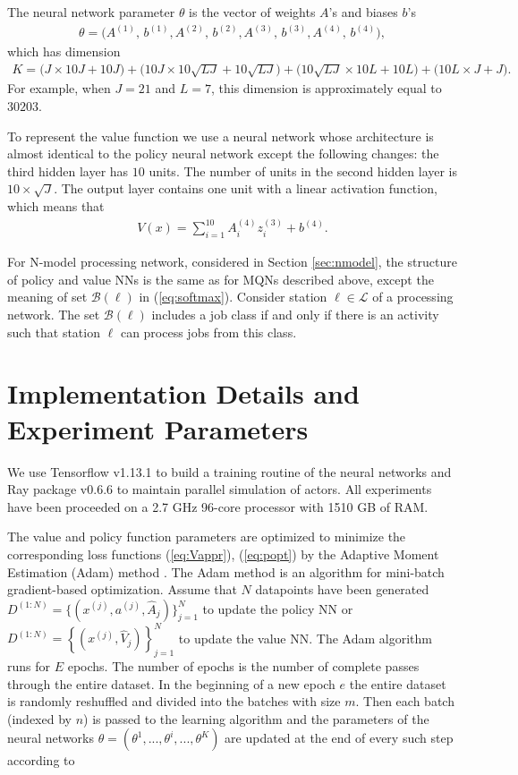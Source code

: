 \documentclass[11pt]{article}
\newcommand{\B}{\mathcal{B}}
\newcommand{\LL}{\mathcal{L}}
\theoremstyle{definition}
\numberwithin{equation}{section}
\begin{document}
The neural network parameter $\theta$ is the vector of weights $A$'s and biases $b$'s
\begin{align*}
\theta=  \Big(A^{(1)},\, b^{(1)}, A^{(2)},\, b^{(2)}, A^{(3)},\, b^{(3)}, A^{(4)},\, b^{(4)}\Big),
\end{align*}
which has dimension
\begin{align*}
  K=\big(J\times 10J + 10J\big) +   \big(10J \times 10\sqrt{LJ} + 10\sqrt{LJ}\big) +    \big(10\sqrt{LJ}\times 10L + 10L\big) +
    \big(10L\times J + J\big).
\end{align*}
For example, when $J=21$ and $L=7$, this dimension is approximately equal to
$30203$.


To represent the value function we use a neural network whose
architecture is almost identical to the policy neural network except
the following changes: the third hidden layer has $10$ units. The
number of units in the second hidden layer is $10\times \sqrt{J}$. The
output layer contains one unit with a linear activation function, which means
that
\begin{align*}
  V(x) = \sum_{i=1}^{10} A^{(4)}_{i} z^{(3)}_i + b^{(4)}.
\end{align*}


 For N-model processing network, considered in Section  \ref{sec:nmodel}, the  structure of policy and value NNs is the same as for MQNs described above, except the meaning of  set $\B(\ell)$ in (\ref{eq:softmax}). Consider   station $\ell\in \LL$ of a processing network. The set   $\B(\ell)$ includes a job class  if and only if  there is an activity  such that station $\ell$ can process jobs from this   class.



\section{Implementation Details and Experiment Parameters}\label{sec:par}

 We use Tensorflow v1.13.1  \cite{Abadi2016} to build a training routine of the neural networks and Ray package v0.6.6 \cite{Moritz2018}
    to maintain parallel simulation of actors. All experiments have been proceeded on a   2.7 GHz  96-core processor with 1510 GB of RAM.

    The value and policy   function parameters are optimized to minimize the corresponding loss functions (\ref{eq:Vappr}), (\ref{eq:popt}) by the Adaptive Moment Estimation (Adam) method \cite{Kingma2017}.
    The Adam method is an algorithm for mini-batch gradient-based optimization.
Assume that $N$ datapoints have been generated  $D^{(1:N)}= \Big\{  (x^{(j)}, a^{(j)}, \hat A_j)\Big\}_{j=1}^N$ to update the policy NN  or $D^{(1:N)} = \left\{  ( x^{(j)}, \hat V_j)\right\}_{j=1}^N$ to update the value NN.
 The Adam algorithm runs for $E$ epochs. The number of epochs is the number of complete passes through the entire dataset. In the beginning of a new epoch $e$ the entire dataset
is randomly reshuffled and divided into the batches with size $m$. Then each batch (indexed by $n$) is passed to the learning algorithm and the parameters
of the neural networks $\theta = (\theta^1, ..., \theta^i, ..., \theta^K)$  are updated at the end of every such step  according to
\end{document}
